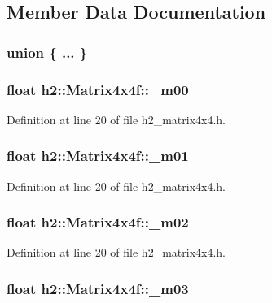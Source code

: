 \subsection{Member Data Documentation}
\hypertarget{classh2_1_1_matrix4x4f_a0d20250511afcc3b715460c2f3dce614}{\subsubsection[{"@9}]{\setlength{\rightskip}{0pt plus 5cm}union \{ ... \} }}\label{classh2_1_1_matrix4x4f_a0d20250511afcc3b715460c2f3dce614}
\hypertarget{classh2_1_1_matrix4x4f_a5121665de42831399b3e5f5328f9218e}{
\subsubsection[{\-\_\-m00}]{\setlength{\rightskip}{0pt plus 5cm}float h2\-::\-Matrix4x4f\-::\-\_\-m00}}\label{classh2_1_1_matrix4x4f_a5121665de42831399b3e5f5328f9218e}


Definition at line 20 of file h2\-\_\-matrix4x4.\-h.

\hypertarget{classh2_1_1_matrix4x4f_a0ef9fa934da1bf15da717b56de41334c}{
\subsubsection[{\-\_\-m01}]{\setlength{\rightskip}{0pt plus 5cm}float h2\-::\-Matrix4x4f\-::\-\_\-m01}}\label{classh2_1_1_matrix4x4f_a0ef9fa934da1bf15da717b56de41334c}


Definition at line 20 of file h2\-\_\-matrix4x4.\-h.

\hypertarget{classh2_1_1_matrix4x4f_a4b248a3d617ad43fc36c5c91d31c35a3}{
\subsubsection[{\-\_\-m02}]{\setlength{\rightskip}{0pt plus 5cm}float h2\-::\-Matrix4x4f\-::\-\_\-m02}}\label{classh2_1_1_matrix4x4f_a4b248a3d617ad43fc36c5c91d31c35a3}


Definition at line 20 of file h2\-\_\-matrix4x4.\-h.

\hypertarget{classh2_1_1_matrix4x4f_af9be57875aeb679dcc718f5e2af838c1}{
\subsubsection[{\-\_\-m03}]{\setlength{\rightskip}{0pt plus 5cm}float h2\-::\-Matrix4x4f\-::\-\_\-m03}}\label{classh2_1_1_matrix4x4f_af9be57875aeb679dcc718f5e2af838c1}


